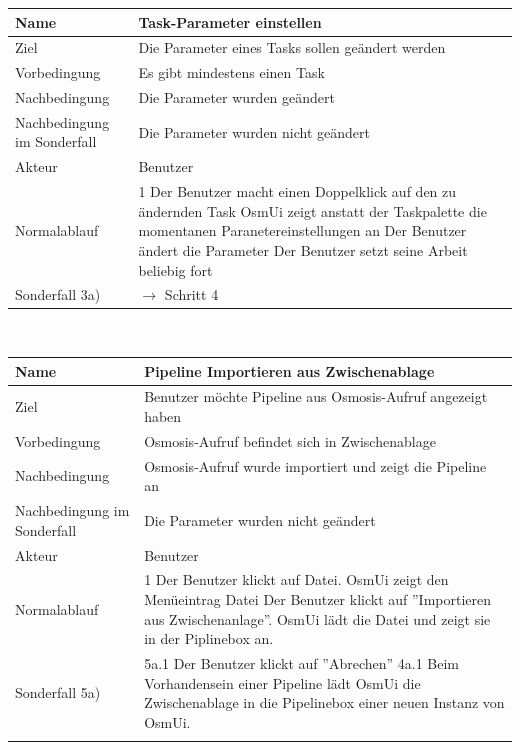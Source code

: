 \documentclass[a4paper,12pt]{scrartcl}
\begin{document}
\begin{center}
\begin{tabular}{|p{5cm}|p{10cm}|}
\hline Name & \textbf{Task-Parameter einstellen} \\ 
\hline Ziel & Die Parameter eines Tasks sollen geändert werden\\ 
\hline Vorbedingung & Es gibt mindestens einen Task\\ 
\hline Nachbedingung & Die Parameter wurden geändert \\  
\hline Nachbedingung im Sonderfall & Die Parameter wurden nicht geändert\\
\hline Akteur & Benutzer \\ 
\hline Normalablauf & 1 Der Benutzer macht einen Doppelklick auf den zu ändernden Task
\newline 2 OsmUi zeigt anstatt der Taskpalette die momentanen Paranetereinstellungen an
\newline 3 Der Benutzer ändert die Parameter
\newline 4 Der Benutzer setzt seine Arbeit beliebig fort\\ 
\hline Sonderfall 3a) & $ \rightarrow$ Schritt 4\\
\hline 
\end{tabular} 
\vspace{0.7cm}
\\
\begin{tabular}{|p{5cm}|p{10cm}|}
\hline Name & \textbf{Pipeline Importieren aus Zwischenablage} \\ 
\hline Ziel & Benutzer möchte Pipeline aus Osmosis-Aufruf angezeigt haben\\ 
\hline Vorbedingung & Osmosis-Aufruf befindet sich in Zwischenablage\\ 
\hline Nachbedingung & Osmosis-Aufruf wurde importiert und zeigt die Pipeline an \\  
\hline Nachbedingung im Sonderfall & Die Parameter wurden nicht geändert\\
\hline Akteur & Benutzer \\ 
\hline Normalablauf & 1 Der Benutzer klickt auf Datei.
\newline 
2 OsmUi zeigt den Menüeintrag Datei
\newline
3 Der Benutzer klickt auf ''Importieren aus Zwischenanlage''.
\newline
4 OsmUi lädt die Datei und zeigt sie in der Piplinebox an.
\\ 
\hline Sonderfall 5a) & 5a.1 Der Benutzer klickt auf ''Abrechen''
\newline
4a.1 Beim Vorhandensein einer Pipeline lädt OsmUi die Zwischenablage in die Pipelinebox einer neuen Instanz von OsmUi.\\\\

\end{tabular}
\end{center}
\end{document}
